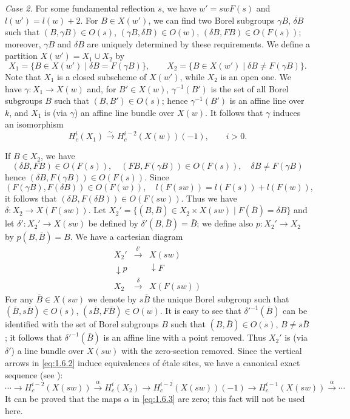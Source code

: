 \documentclass[11pt]{amsart}
\theoremstyle{plain}
\theoremstyle{remark}
\begin{document}
\textit{Case 2.} For some fundamental reflection $s$, we have $w' = s w F(s)$ and $l(w') = l(w) + 2$. For $B \in X(w')$, we can find two Borel subgroups $\gamma B$, $\delta B$ such that $(B, \gamma B) \in O(s)$, $(\gamma B, \delta B) \in O(w)$, $(\delta B, FB) \in O(F(s))$; moreover, $\gamma B$ and $\delta B$ are uniquely determined by these requirements. We define a partition $X(w') = X_1 \cup X_2$ by
\[
X_1 = \{B \in X(w') \mid \delta B = F(\gamma B)\}, \qquad X_2 = \{B \in X(w') \mid \delta B \neq F(\gamma B)\}.
\]
Note that $X_1$ is a closed subscheme of $X(w')$, while $X_2$ is an open one. We have $\gamma: X_1 \to X(w)$ and, for $B' \in X(w)$, $\gamma^{-1}(B')$ is the set of all Borel subgroups $B$ such that $(B, B') \in O(s)$; hence $\gamma^{-1}(B')$ is an affine line over $k$, and $X_1$ is (via $\gamma$) an affine line bundle over $X(w)$. It follows that $\gamma$ induces an isomorphism
\begin{equation}\label{eq:1.6.1}
H_c^i(X_1) \xrightarrow{\sim} H_c^{i-2}(X(w))(-1), \qquad i > 0.
\end{equation}

If $B \in X_2$, we have
\[
(\delta B, FB) \in O(F(s)), \quad (FB, F(\gamma B)) \in O(F(s)), \quad \delta B \neq F(\gamma B)
\]
hence $(\delta B, F(\gamma B)) \in O(F(s))$. Since
\[
(F(\gamma B), F(\delta B)) \in O(F(w)), \quad l(F(sw)) = l(F(s)) + l(F(w)),
\]
it follows that $(\delta B, F(\delta B)) \in O(F(sw))$. Thus we have $\delta: X_2 \to X(F(sw))$. Let $X_2' = \{(B, \bar{B}) \in X_2 \times X(sw) \mid F(\bar{B}) = \delta B\}$ and let $\delta': X_2' \to X(sw)$ be defined by $\delta'(B, \bar{B}) = \bar{B}$; we define also $p: X_2' \to X_2$ by $p(B, \bar{B}) = B$. We have a cartesian diagram
\begin{equation}\label{eq:1.6.2}
\begin{array}{ccc}
X_2' & \xrightarrow{\delta'} & X(sw) \\
\downarrow{p} & & \downarrow{F} \\
X_2 & \xrightarrow{\delta} & X(F(sw))
\end{array}
\end{equation}
For any $\bar{B} \in X(sw)$ we denote by $s\bar{B}$ the unique Borel subgroup such that $(\bar{B}, s\bar{B}) \in O(s)$, $(s\bar{B}, F\bar{B}) \in O(w)$. It is easy to see that $\delta'^{-1}(\bar{B})$ can be identified with the set of Borel subgroups $B$ such that $(B, \bar{B}) \in O(s)$, $B \neq s\bar{B}$; it follows that $\delta'^{-1}(\bar{B})$ is an affine line with a point removed. Thus $X_2'$ is (via $\delta'$) a line bundle over $X(sw)$ with the zero-section removed. Since the vertical arrows in \eqref{eq:1.6.2} induce equivalences of \'etale sites, we have a canonical exact sequence (see \cite{SGA4.5}):
\begin{equation}\label{eq:1.6.3}
\cdots \longrightarrow H_c^{i-2}(X(sw)) \xrightarrow{\alpha} H_c^i(X_2) \longrightarrow H_c^{i-2}(X(sw))(-1) \longrightarrow H_c^{i-1}(X(sw)) \xrightarrow{\alpha} \cdots
\end{equation}
It can be proved that the maps $\alpha$ in \eqref{eq:1.6.3} are zero; this fact will not be used here.
\end{document}
